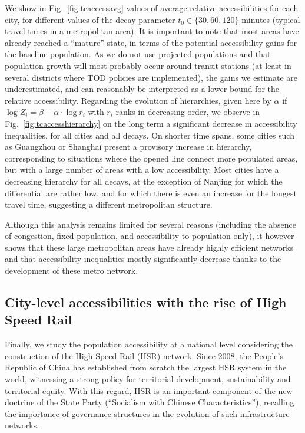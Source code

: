 We show in Fig.~\ref{fig:tcaccessavg} values of average relative accessibilities for each city, for different values of the decay parameter $t_0 \in \{30,60,120\}$ minutes (typical travel times in a metropolitan area). It is important to note that most areas have already reached a ``mature'' state, in terms of the potential accessibility gains for the baseline population. As we do not use projected populations and that population growth will most probably occur around transit stations (at least in several districts where TOD policies are implemented), the gains we estimate are underestimated, and can reasonably be interpreted as a lower bound for the relative accessibility. Regarding the evolution of hierarchies, given here by $\alpha$ if $\log Z_i = \beta - \alpha \cdot \log r_i$ with $r_i$ ranks in decreasing order, we observe in Fig.~\ref{fig:tcaccesshierarchy} on the long term a significant decrease in accessibility inequalities, for all cities and all decays. On shorter time spans, some cities such as Guangzhou or Shanghai present a provisory increase in hierarchy, corresponding to situations where the opened line connect more populated areas, but with a large number of areas with a low accessibility. Most cities have a decreasing hierarchy for all decays, at the exception of Nanjing for which the differential are rather low, and for which there is even an increase for the longest travel time, suggesting a different metropolitan structure.

Although this analysis remains limited for several reasons (including the absence of congestion, fixed population, and accessibility to population only), it however shows that these large metropolitan areas have already highly efficient networks and that accessibility inequalities mostly significantly decrease thanks to the development of these metro network.





\subsection{City-level accessibilities with the rise of High Speed Rail}




Finally, we study the population accessibility at a national level considering the construction of the High Speed Rail (HSR) network. Since 2008, the People's Republic of China has established from scratch the largest HSR system in the world, witnessing a strong policy for territorial development, sustainability and territorial equity. With this regard, HSR is an important component of the new doctrine of the State Party (``Socialism with Chinese Characteristics''), recalling the importance of governance structures in the evolution of such infrastructure networks.

